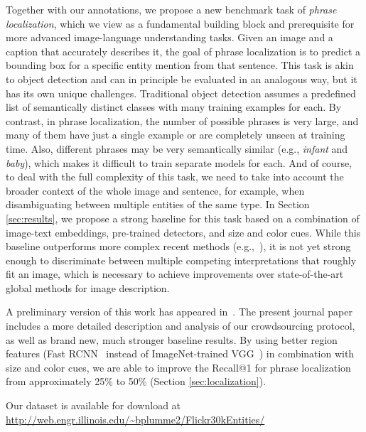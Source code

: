 \documentclass[twocolumn]{svjour3}
\begin{document}
Together with our annotations, we propose a new benchmark task of {\em phrase localization}, which we view as a fundamental building block and prerequisite for more advanced image-language understanding tasks. Given an image and a caption that accurately describes it, the goal of phrase localization is to predict a bounding box for a specific entity mention from that sentence. This task is akin to object detection and can in principle be evaluated in an analogous way, but it has its own unique challenges. Traditional object detection assumes a predefined list of semantically distinct classes with many training examples for each. By contrast, in phrase localization, the number of possible phrases is very large, and many of them have just a single example or are completely unseen at training time. Also, different phrases may be very semantically similar (e.g., \emph{infant} and \emph{baby}), which makes it difficult to train separate models for each. And of course, to deal with the full complexity of this task, we need to take into account the broader context of the whole image and sentence, for example, when disambiguating between multiple entities of the same type. In Section \ref{sec:results}, we propose a strong baseline for this task based on a combination of image-text embeddings, pre-trained detectors, and size and color cues. While this baseline outperforms more complex recent methods (e.g.,~\cite{rohrbach2015}), it is not yet strong enough to discriminate between multiple competing interpretations that roughly fit an image, which is necessary to achieve improvements over state-of-the-art global methods for image description.



A preliminary version of this work has appeared in~\cite{flickrentities}. The present journal paper includes a more detailed description and analysis of our crowdsourcing protocol, as well as brand new, much stronger baseline results. By using better region features (Fast RCNN~\citep{girshickICCV15fastrcnn} instead of ImageNet-trained VGG~\citep{simonyan2014very}) in combination with size and color cues, we are able to improve the Recall@1 for phrase localization from approximately 25\% to 50\% (Section \ref{sec:localization}).

Our dataset is available for download at \url{http://web.engr.illinois.edu/~bplumme2/Flickr30kEntities/}
\end{document}
